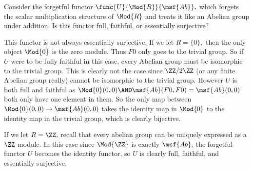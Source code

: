 \documentclass[main.tex]{subfiles}
\begin{document}
	\begin{exercise}
		Consider the forgetful functor $ \func{U}{\Mod{R}}{\msf{Ab}}, $ which
		forgets the scalar multiplication structure of $ \Mod{R} $ and treats
		it like an Abelian group under addition. Is this functor full, faithful, 
		or essentially surjective?
	\end{exercise}
	This functor is not always essentially surjective. If we let $ R=\{0\}, $
	then the only object $ \Mod{0}$ is the zero module. Thus $ F0 $ only goes to 
	the trivial group. So if $ U $ were to be fully faithful in this case, every 
	Abelian group must be isomorphic to the trivial group. This is clearly
	not the case since $ \ZZ/2\ZZ $ (or any finite Abelian group really) cannot 
	be isomorphic to the trivial group. However $ U $ is both full and faithful
	as $ \Mod{0}(0,0)\AND \msf{Ab}(F0,F0)=\msf{Ab}(0,0) $ both only have one element
	in them. So the only map between $ \Mod{0}(0,0)\to \msf{Ab}(0,0) $ takes the 
	identity map in $ \Mod{0} $ to the identity map in the trivial group, which 
	is clearly bijective.    
	
	If we let $ R=\ZZ,$ recall that every abelian group can be uniquely 
	expressed as a $\ZZ$-module. In this case since $ \Mod{\ZZ} $ is exactly
	$ \msf{Ab},$ the forgetful functor $ U $ becomes the identity functor, so 
	$ U $ is clearly full, faithful, and essentially surjective.
	
\end{document}
